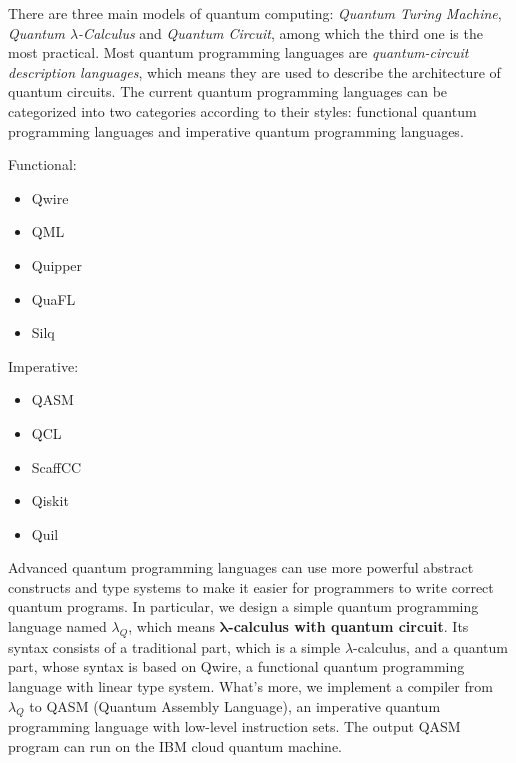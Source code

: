 There are three main models of quantum computing: \textit{Quantum Turing Machine}, \textit{Quantum $\lambda$-Calculus} and \textit{Quantum Circuit}, among which the third one is the most practical.
Most quantum programming languages are \textit{quantum-circuit description languages}, which means they are used to describe the architecture of quantum circuits.
The current quantum programming languages can be categorized into two categories according to their styles: functional quantum programming languages and imperative quantum programming languages.
\begin{multicols}{2}
  \begin{center}
    Functional:
  \end{center}
  \begin{itemize}
    \item Qwire
    \item QML
    \item Quipper
    \item QuaFL
    \item Silq
  \end{itemize}

  \columnbreak

  \begin{center}
    Imperative:
  \end{center}
  \begin{itemize}
    \item QASM
    \item QCL
    \item ScaffCC
    \item Qiskit
    \item Quil
  \end{itemize}
\end{multicols}

Advanced quantum programming languages can use more powerful abstract constructs and type systems to make it easier for programmers to write correct quantum programs.
In particular, we design a simple quantum programming language named $\lambda_Q$, which means \textbf{$\boldsymbol{\lambda}$-calculus with quantum circuit}.
Its syntax consists of a traditional part, which is a simple $\lambda$-calculus, and a quantum part, whose syntax is based on Qwire, a functional quantum programming language with linear type system.
What's more, we implement a compiler from $\lambda_Q$ to QASM (Quantum Assembly Language), an imperative quantum programming language with low-level instruction sets.
The output QASM program can run on the IBM cloud quantum machine.

